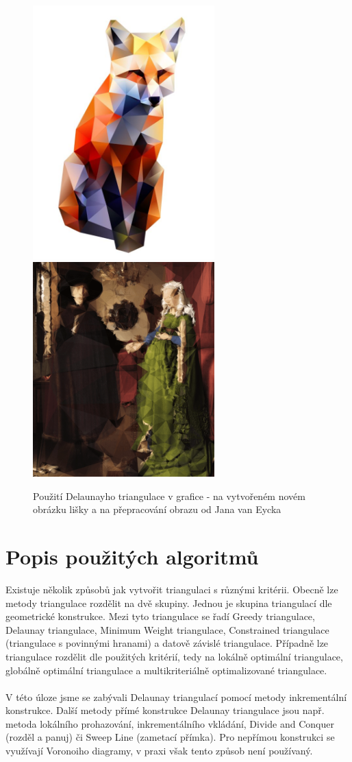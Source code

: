 \documentclass[a4paper, 12pt]{article}
\begin{document}
\begin{figure}[h!]
\centering
\includegraphics[width=7cm]{pictures/liska.jpg}
\includegraphics[width=7cm]{pictures/jan_van_eyck.png}
\caption{Použití Delaunayho triangulace v grafice - na vytvořeném novém obrázku lišky a na přepracování obrazu od Jana van Eycka}
\end{figure}

\section{Popis použitých algoritmů}
Existuje několik způsobů jak vytvořit triangulaci s různými kritérii. Obecně lze metody triangulace rozdělit na dvě skupiny. Jednou je skupina triangulací dle geometrické konstrukce. Mezi tyto triangulace se řadí Greedy triangulace, Delaunay triangulace, Minimum Weight triangulace, Constrained triangulace (triangulace s povinnými hranami) a datově závislé triangulace. Případně lze triangulace rozdělit dle použitých kritérií, tedy na lokálně optimální triangulace, globálně optimální triangulace a multikriteriálně optimalizované triangulace. \\
\\
V této úloze jsme se zabývali Delaunay triangulací pomocí metody inkrementální konstrukce. Další metody přímé konstrukce Delaunay triangulace jsou např. metoda lokálního prohazování, inkrementálního vkládání, Divide and Conquer (rozděl a panuj) či Sweep Line (zametací přímka). Pro nepřímou konstrukci se využívají Voronoiho diagramy, v praxi však tento způsob není používaný. 
\end{document}
